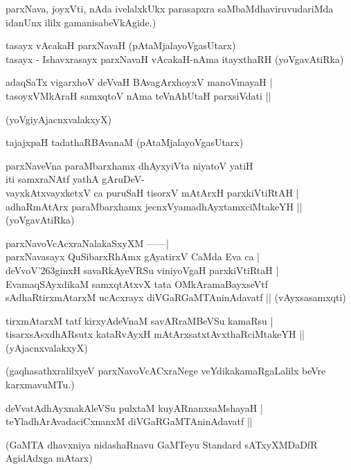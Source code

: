 parxNava, joyxVti, nAda ivelalxkUkx para\-sapxra saMbaMdhaviruvudariMda idanUnx ililx gamanisabeVkAgide.)
\begin{itemize}
{\bf 
\item[23.] tasayx vAcakaH parxNavaH (pAtaMjalayoVgasUtarx)\\\label{147}
tasayx - Ishavxrasayx parxNavaH vAcakaH-nAma itayxthaRH 
\hfill{(yoVgavAtiRka)}
\item[24.] adaqSaTx vigarxhoV deVvaH BAvagArxhoyxV manoVmayaH |\\\label{147}
tasoyxVMkAraH samxqtoV nAma teVnAhUtaH parxsiVdati ||

\hfill{(yoVgiyAjacnxvalakxyX)}
\item[25.] tajajxpaH tadathaRBAvanaM \hfill{(pAtaMjalayoVgasUtarx)}\label{147}
\item[26.] parxNaveVna paraMbarxhamx dhAyxyiVta niyatoV yatiH\\\label{147}
iti samxraNAtf yathA gAruDeV-\\
vayxkAtxvayxketxV ca puruSaH tisorxV mAtArxH parxkiVtiRtAH |\\
adhaRmAtArx paraMbarxhamx jecnxVyamadhAyxtamxciMtakeYH ||
\hfill{(yoVgavAtiRka)}
\item[27.] parxNavoVcAcxraNalakaSxyXM ------|\\\label{147}
parxNavasayx QuSibarxRhAmx gAyatirxV CaMda Eva ca |\\
deVvoV\char'263ginxH savaRkAyeVRSu viniyoVgaH parxkiVtiRtaH |\\
EvamaqSAyxdikaM samxqtAtxvX tata OMkAramaBayxseVtf\\
sAdhaRtirxmAtarxM ucAcxrayx diVGaRGaMTAninAdavatf ||
\hfill{(vAyxsasamxqti)}

\item[28.] tirxmAtarxM tatf kirxyAdeVnaM savARraMBeVSu kamaRsu |\\\label{147}
tisarxsAsxdhARsutx kataRvAyxH mAtArxsatxtAvxthaRciMtakeYH ||
\hfill{(yAjacnxvalakxyX)}}
\end{itemize}

\noindent
(gaqhasathxralilxyeV parxNavoVcACxraNege veYdikakamaRgaLalilx beVre karxmavuMTu.)

\begin{itemize}
{\bf 
\item[29.] deVvatAdhAyxnakAleVSu pulxtaM kuyARnanxsaMshayaH |\\\label{148}
teYladhArAvadaciCxnanxM diVGaRGaMTAninAdavatf ||}
\end{itemize}

\noindent
(GaMTA dhavxniya nidashaRnavu GaMTeyu {\rm Standard} sATxyXMDaDfR AgidAdxga mAtarx)

